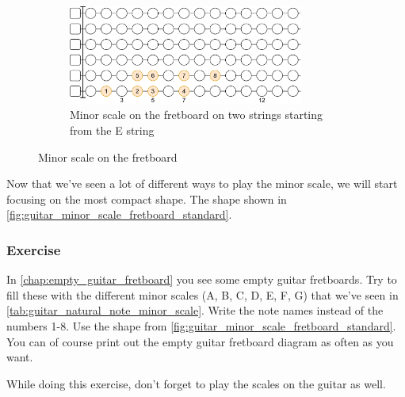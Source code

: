 \begin{figure}[h]
	\vspace{0.5cm}
	\begin{subfigure}[b]{\textwidth}
		\centering
		\includegraphics[width=0.85\textwidth]{../../Images/guitar_minor_scale_double_string_from_e.png}
		\caption{Minor scale on the fretboard on two strings starting from the E string}
		\label{fig:guitar_minor_scale_fretboard_double_string_from_e}
	\end{subfigure}
	
	\caption{Minor scale on the fretboard}
	\label{fig:guitar_minor_scale_fretboard}
\end{figure}

\newpage

Now that we've seen a lot of different ways to play the minor scale, we will start focusing on the most compact shape. The shape shown in \autoref{fig:guitar_minor_scale_fretboard_standard}.

\subsubsection{Exercise}

In \autoref{chap:empty_guitar_fretboard} you see some empty guitar fretboards. Try to fill these with the different minor scales (A, B, C, D, E, F, G) that we've seen in \autoref{tab:guitar_natural_note_minor_scale}. Write the note names instead of the numbers 1-8. Use the shape from \autoref{fig:guitar_minor_scale_fretboard_standard}. You can of course print out the empty guitar fretboard diagram as often as you want.

While doing this exercise, don't forget to play the scales on the guitar as well.

